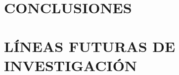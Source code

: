 \documentclass[12pt]{article}
\begin{document}
\newpage
\section{CONCLUSIONES} 
    

\newpage
\section{LÍNEAS FUTURAS DE INVESTIGACIÓN} 
    

\newpage

% 
\printbibliography[title={Bibliografía}]

%     
\end{document}
